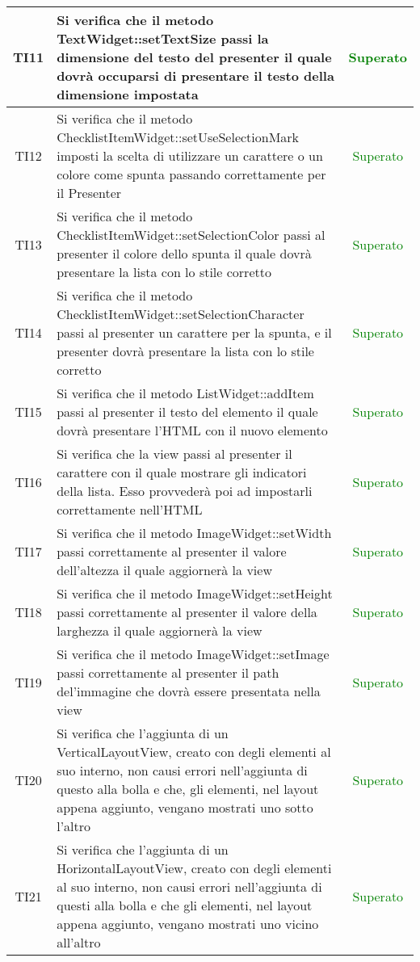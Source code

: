 \begin{center}
\begin{longtable}{|c|>{\centering}m{10cm}|c|}
		TI11 & Si verifica che il metodo TextWidget::setTextSize passi la dimensione del testo del presenter il quale dovrà occuparsi di presentare il testo della dimensione impostata & \textcolor{Green}{Superato}\\ \hline
		TI12 & Si verifica che il metodo ChecklistItemWidget::setUseSelectionMark imposti la scelta di utilizzare un carattere o un colore come spunta passando correttamente per il Presenter & \textcolor{Green}{Superato}\\ \hline
		TI13 & Si verifica che il metodo ChecklistItemWidget::setSelectionColor passi al presenter il colore dello spunta il quale dovrà presentare la lista con lo stile corretto & \textcolor{Green}{Superato}\\ \hline
		TI14 & Si verifica che il metodo ChecklistItemWidget::setSelectionCharacter passi al presenter un carattere per la spunta, e il presenter dovrà presentare la lista con lo stile corretto & \textcolor{Green}{Superato}\\ \hline
		TI15 & Si verifica che il metodo ListWidget::addItem passi al presenter il testo del elemento il quale dovrà presentare l'HTML con il nuovo elemento & \textcolor{Green}{Superato}\\ \hline
		TI16 & Si verifica che la view passi al presenter il carattere con il quale mostrare gli indicatori della lista. Esso provvederà poi ad impostarli correttamente nell'HTML & \textcolor{Green}{Superato}\\ \hline
		TI17 & Si verifica che il metodo ImageWidget::setWidth passi correttamente al presenter il valore dell'altezza il quale aggiornerà la view & \textcolor{Green}{Superato}\\ \hline
		TI18 & Si verifica che il metodo ImageWidget::setHeight passi correttamente al presenter il valore della larghezza il quale aggiornerà la view & \textcolor{Green}{Superato}\\ \hline
		TI19 & Si verifica che il metodo ImageWidget::setImage passi correttamente al presenter il path del'immagine che dovrà essere presentata nella view & \textcolor{Green}{Superato}\\ \hline
		TI20 & Si verifica che l'aggiunta di un VerticalLayoutView, creato con degli elementi al suo interno, non causi errori nell'aggiunta di questo alla bolla e che, gli elementi, nel layout appena aggiunto, vengano mostrati uno sotto l'altro & \textcolor{Green}{Superato}\\ \hline
		TI21 & Si verifica che l'aggiunta di un HorizontalLayoutView, creato con degli elementi al suo interno, non causi errori nell'aggiunta di questi alla bolla e che gli elementi, nel layout appena aggiunto, vengano mostrati uno vicino all'altro & \textcolor{Green}{Superato}\\ \hline

\end{longtable}
\end{center}
